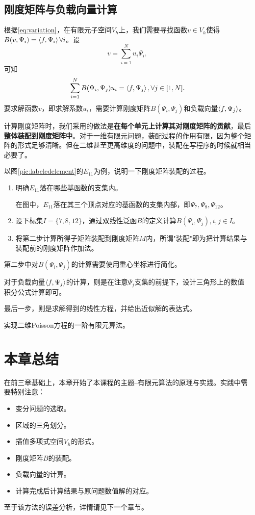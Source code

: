 \subsection{刚度矩阵与负载向量计算}
根据\eqref{eq:variation}，在有限元子空间$V_{h}$上，我们需要寻找函数$v\in V_{h}$使得$B(v,\Psi_{i})=\left<f,\Psi_{i}\right>\forall i$。设
\begin{equation}
    v=\sum_{i=1}^{N}u_{i}\Psi_{i},
\end{equation}
可知
\begin{equation}
    \sum_{i=1}^{N}B(\Psi_{i},\Psi_{j})u_{i}=\left<f,\Psi_{j}\right>,\forall j\in[1,N].
\end{equation}
要求解函数$v$，即求解系数$u_{i}$，需要计算刚度矩阵$B(\Psi_{i},\Psi_{j})$和负载向量$\left<f,\Psi_{j}\right>$。

计算刚度矩阵时，我们采用的做法是\textbf{在每个单元上计算其对刚度矩阵的贡献}，最后\textbf{整体装配到刚度矩阵中}。对于一维有限元问题，装配过程的作用有限，因为整个矩阵的形式足够清晰。但在二维甚至更高维度的问题中，装配在写程序的时候就相当必要了。

以图\ref{pic:labeledelement}的$E_{11}$为例，说明一下刚度矩阵装配的过程。
\begin{enumerate}
    \item 明确$E_{11}$落在哪些基函数的支集内。
    
    在图中，$E_{11}$落在其三个顶点对应的基函数的支集内部，即$\Psi_{7},\Psi_{8},\Psi_{12}$。
    \item 设下标集$I=\{7,8,12\}$，通过双线性泛函$B$的定义计算$B(\Psi_{i},\Psi_{j}),i,j\in I$。
    \item 将第二步计算所得子矩阵装配到刚度矩阵$M$内，所谓"装配"即为把计算结果与装配前的刚度矩阵作加法。
\end{enumerate}

第二步中对$B(\Psi_{i},\Psi_{j})$的计算需要使用重心坐标进行简化。

对于负载向量$\left<f,\Psi_{j}\right>$的计算，则是在注意$\Psi_{j}$支集的前提下，设计三角形上的数值积分公式计算即可。

最后一步，则是求解得到的线性方程，并给出近似解的表达式。

\begin{exercise}
    实现二维Poisson方程的一阶有限元算法。
\end{exercise}
\section{本章总结}
在前三章基础上，本章开始了本课程的主题--有限元算法的原理与实践。实践中需要特别注意：
\begin{itemize}
    \item 变分问题的选取。
    \item 区域的三角划分。
    \item 插值多项式空间$V_{h}$的形式。
    \item 刚度矩阵$B$的装配。
    \item 负载向量的计算。
    \item 计算完成后计算结果与原问题数值解的对应。
\end{itemize}
至于该方法的误差分析，详情请见下一个章节。